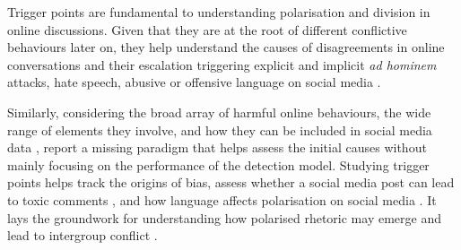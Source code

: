 Trigger points are fundamental to understanding polarisation and division in online discussions. Given that they are at the root of different conflictive behaviours later on, they help understand the causes of disagreements in online conversations \cite{de-kock-vlachos-2021-beg2} and their escalation \cite{de-kock-vlachos-2022-disagree,van-der-meer-etal-2023-differences} triggering explicit and implicit \textit{ad hominem} attacks, hate speech, abusive or offensive language on social media \cite{Talat2016HatefulSO, davidson2017automated,basile-etal-2019-semeval2,ousidhoum-etal-2019-multilingual2,sap-etal-2019-social2, elsherief-etal-2021-latent2, ocampo-etal-2023-depth}.%


Similarly, considering the broad array of harmful online behaviours, the wide range of elements they involve, and how they can be included in social media data \cite{olteanu2019social}, \citet{blodgett-etal-2020-language2} report a missing paradigm that helps assess the initial causes without mainly focusing on the performance of the detection model. Studying trigger points helps track the origins of bias, assess whether a social media post can lead to toxic comments \cite{dahiya2021would}, and how language affects polarisation on social media \cite{Karjus2024}. It lays the groundwork for understanding how polarised rhetoric may emerge and lead to intergroup conflict \cite{Almog22}.



